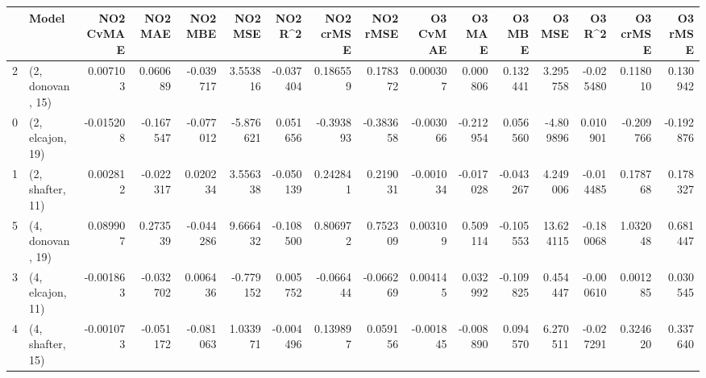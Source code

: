 \begin{tabular}{llrrrrrrrrrrrrrr}
\toprule
{} &             Model &  NO2 CvMAE &   NO2 MAE &   NO2 MBE &   NO2 MSE &   NO2 R\textasciicircum2 &  NO2 crMSE &  NO2 rMSE &  O3 CvMAE &    O3 MAE &    O3 MBE &     O3 MSE &    O3 R\textasciicircum2 &  O3 crMSE &   O3 rMSE \\
\midrule
2 &  (2, donovan, 15) &   0.007103 &  0.060689 & -0.039717 &  3.553816 & -0.037404 &   0.186559 &  0.178372 &  0.000307 &  0.000806 &  0.132441 &   3.295758 & -0.025480 &  0.118010 &  0.130942 \\
0 &  (2, elcajon, 19) &  -0.015208 & -0.167547 & -0.077012 & -5.876621 &  0.051656 &  -0.393893 & -0.383658 & -0.003066 & -0.212954 &  0.056560 &  -4.809896 &  0.010901 & -0.209766 & -0.192876 \\
1 &  (2, shafter, 11) &   0.002812 & -0.022317 &  0.020234 &  3.556338 & -0.050139 &   0.242841 &  0.219031 & -0.001034 & -0.017028 & -0.043267 &   4.249006 & -0.014485 &  0.178768 &  0.178327 \\
5 &  (4, donovan, 19) &   0.089907 &  0.273539 & -0.044286 &  9.666432 & -0.108500 &   0.806972 &  0.752309 &  0.003109 &  0.509114 & -0.105553 &  13.624115 & -0.180068 &  1.032048 &  0.681447 \\
3 &  (4, elcajon, 11) &  -0.001863 & -0.032702 &  0.006436 & -0.779152 &  0.005752 &  -0.066444 & -0.066269 &  0.004145 &  0.032992 & -0.109825 &   0.454447 & -0.000610 &  0.001285 &  0.030545 \\
4 &  (4, shafter, 15) &  -0.001073 & -0.051172 & -0.081063 &  1.033971 & -0.004496 &   0.139897 &  0.059156 & -0.001845 & -0.008890 &  0.094570 &   6.270511 & -0.027291 &  0.324620 &  0.337640 \\
\bottomrule
\end{tabular}
